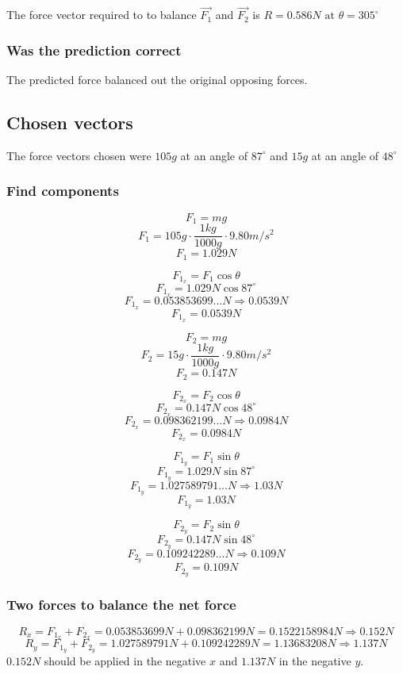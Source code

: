 \documentclass[11pt, letterpaper, includehead]{article}
\begin{document}
The force vector required to to balance $\vec{F_1}$ and $\vec{F_2}$ is
$R = 0.586N \text{ at } \theta = 305^{\circ}$

\subsubsection{Was the prediction correct} %
The predicted force balanced out the original opposing forces. 

\subsection{Chosen vectors} %
The force vectors chosen were $105g$ at an angle of $87^{\circ}$ and $15g$ at an angle of $48^{\circ}$

\subsubsection{Find components} %
\begin{multicols}{2}
  $$F_1 = mg$$
  $$F_1 = 105g \cdot \frac{1kg}{1000g} \cdot 9.80m/s^2$$
  $$F_1 = 1.029N$$

  $$F_{1_x} = F_1\cos\theta$$
  $$F_{1_x} = 1.029N\cos87^{\circ}$$
  $$F_{1_x} = 0.053853699...N \Rightarrow 0.0539N$$
  $$\boxed{F_{1_x} = 0.0539N}$$

  \columnbreak
  $$F_2 = mg$$
  $$F_2 = 15g \cdot \frac{1kg}{1000g} \cdot 9.80m/s^2$$
  $$F_2 = 0.147N$$

  $$F_{2_x} = F_2\cos\theta$$
  $$F_{2_x} = 0.147N\cos48^{\circ}$$
  $$F_{2_x} = 0.098362199...N \Rightarrow 0.0984N$$
  $$\boxed{F_{2_x} = 0.0984N}$$
 
\end{multicols}

\begin{multicols}{2}

  $$F_{1_y} = F_1\sin\theta$$
  $$F_{1_y} = 1.029N\sin87^{\circ}$$
  $$F_{1_y} = 1.027589791...N \Rightarrow 1.03N$$
  $$\boxed{F_{1_y} = 1.03N}$$

  \columnbreak
  $$F_{2_y} = F_2\sin\theta$$
  $$F_{2_y} = 0.147N\sin48^{\circ}$$
  $$F_{2_y} = 0.109242289...N \Rightarrow 0.109N$$
  $$\boxed{F_{2_y} = 0.109N}$$
 
\end{multicols}

\subsubsection{Two forces to balance the net force} %
$$R_x = F_{1_x} + F_{2_x} = 0.053853699N + 0.098362199N = 0.1522158984N \Rightarrow \boxed{0.152N}$$
$$R_y = F_{1_y} + F_{2_y} = 1.027589791N + 0.109242289N = 1.13683208N \Rightarrow \boxed{1.137N}$$
$0.152N$ should be applied in the negative $x$ and $1.137N$ in the negative $y$.
\end{document}
